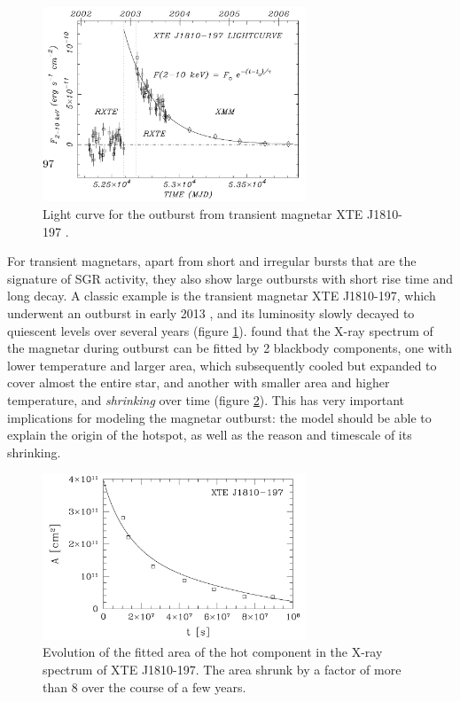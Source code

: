 \begin{figure}[h]
  \centering
  \includegraphics[width=0.7\textwidth]{pics/intro/transient.png}
  \caption[Light curve for the outburst from transient magnetar XTE J1810-197]{Light curve for the outburst from transient magnetar XTE J1810-197 \citep{gotthelf_anatomy_2007}.}
  \label{fig:outburst-light-curve}
\end{figure}

For transient magnetars, apart from short and irregular bursts that are the
signature of SGR activity, they also show large outbursts with short rise time
and long decay. A classic example is the transient magnetar XTE J1810-197, which
underwent an outburst in early 2013 \citep{ibrahim_discovery_2004}, and its
luminosity slowly decayed to quiescent levels over several years (figure
\ref{fig:outburst-light-curve}). \citet{gotthelf_anatomy_2007} found that the
X-ray spectrum of the magnetar during outburst can be fitted by 2 blackbody
components, one with lower temperature and larger area, which subsequently cooled
but expanded to cover almost the entire star, and another with smaller area and
higher temperature, and {\it shrinking} over time (figure
\ref{fig:shrinking-hotspot}). This has very important implications for modeling
the magnetar outburst: the model should be able to explain the origin of the
hotspot, as well as the reason and timescale of its shrinking.

\begin{figure}[h]
  \centering
  \includegraphics[width=0.7\textwidth]{pics/intro/shrink-spot.png}
  \caption[Evolution of the fitted area of the hot component in the X-ray
    spectrum of XTE J1810-197.]{Evolution of the fitted area of the hot component in the X-ray
    spectrum of XTE J1810-197. The area shrunk by a factor of more than 8 over
    the course of a few years.}
  \label{fig:shrinking-hotspot}
\end{figure}

